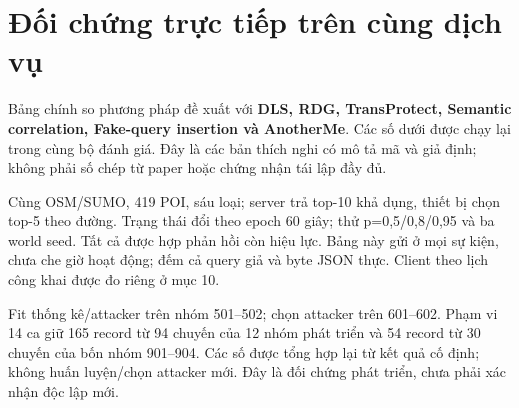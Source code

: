 \documentclass[10pt,a4paper]{article}
\begin{document}
\clearpage
\section{Đối chứng trực tiếp trên cùng dịch vụ}
Bảng chính so phương pháp đề xuất với \textbf{DLS, RDG, TransProtect, Semantic correlation, Fake-query insertion và AnotherMe}. Các số dưới được chạy lại trong cùng bộ đánh giá. Đây là các bản thích nghi có mô tả mã và giả định; không phải số chép từ paper hoặc chứng nhận tái lập đầy đủ.

Cùng OSM/SUMO, 419 POI, sáu loại; server trả top-10 khả dụng, thiết bị chọn top-5 theo đường. Trạng thái đổi theo epoch 60 giây; thử p=0,5/0,8/0,95 và ba world seed. Tất cả được hợp phản hồi còn hiệu lực. Bảng này gửi ở mọi sự kiện, chưa che giờ hoạt động; đếm cả query giả và byte JSON thực. Client theo lịch công khai được đo riêng ở mục 10.

Fit thống kê/attacker trên nhóm 501–502; chọn attacker trên 601–602. Phạm vi 14 ca giữ 165 record từ 94 chuyến của 12 nhóm phát triển và 54 record từ 30 chuyến của bốn nhóm 901–904. Các số được tổng hợp lại từ kết quả cố định; không huấn luyện/chọn attacker mới. Đây là đối chứng phát triển, chưa phải xác nhận độc lập mới.
\end{document}
